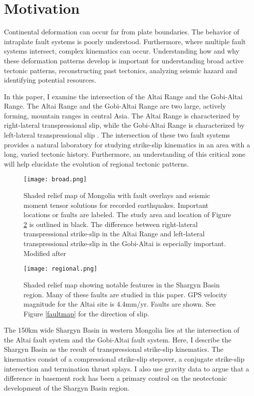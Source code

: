 \section{Motivation}
	Continental deformation can occur far from plate boundaries. The behavior of intraplate fault systems is poorly understood. Furthermore, where multiple fault systems intersect, complex kinematics can occur. Understanding how and why these deformation patterns develop is important for understanding broad active tectonic patterns, reconstructing past tectonics, analyzing seismic hazard and identifying potential resources. 

	In this paper, I examine the intersection of the Altai Range and the Gobi-Altai Range. The Altai Range and the Gobi-Altai Range are two large, actively forming, mountain ranges in central Asia. The Altai Range is characterized by right-lateral transpressional slip, while the Gobi-Altai Range is characterized by left-lateral transpressional slip \citep{Cunningham2005a}\citep{Cunningham2010}. The intersection of these two fault systems provides a natural laboratory for studying strike-slip kinematics in an area with a long, varied tectonic history. Furthermore, an understanding of this critical zone will help elucidate the evolution of regional tectonic patterns.
	
\begin{figure}[h!]
	\centering
	\texttt{[image: broad.png]}
	\caption{Shaded relief map of Mongolia with fault overlays and seismic moment tensor solutions for recorded earthquakes. Important locations or faults are labeled. The study area and location of Figure \ref{regional} is outlined in black. The difference between right-lateral transpressional strike-slip in the Altai Range and left-lateral transpressional strike-slip in the Gobi-Altai is especially important. Modified after \citet{Calais2003}}
	\label{broad}
\end{figure}

\begin{figure}[h!]
	\centering
	\texttt{[image: regional.png]}
	\caption{Shaded relief map showing notable features in the Shargyn Basin region. Many of these faults are studied in this paper. GPS velocity magnitude for the Altai site is 4.4mm/yr. Faults are shown. See Figure \ref{faultmap} for the direction of slip.}
	\label{regional}
\end{figure}
	
	The 150km wide Shargyn Basin in western Mongolia lies at the intersection of the Altai fault system and the Gobi-Altai fault system. Here, I describe the Shargyn Basin as the result of transpressional strike-slip kinematics. The kinematics consist of a compressional strike-slip stepover, a conjugate strike-slip intersection and termination thrust splays. I also use gravity data to argue that a difference in basement rock has been a primary control on the neotectonic development of the Shargyn Basin region.


